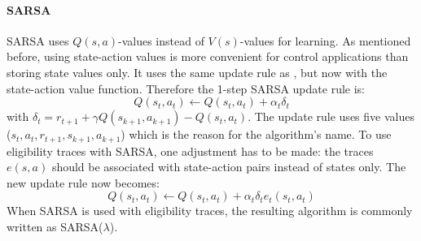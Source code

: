 \documentclass[a4paper,11pt]{mscLiterature}
\begin{document}
		\paragraph{SARSA}
		SARSA \cite{RummeryNiranjan:94} uses $Q(s,a)$-values instead of $V(s)$-values for learning. As mentioned before, using state-action values is more convenient for control applications than storing state values only. It uses the same update rule as , but now with the state-action value function. Therefore the 1-step SARSA update rule is:
		\begin{equation}\label{eqn:SARSAbasic}
				Q(s_t,a_t) \leftarrow Q(s_t,a_t) + \alpha_t \delta_t
		\end{equation}
		with $\delta_t =  r_{t+1} + \gamma Q(s_{k+1},a_{k+1}) - Q(s_t,a_t)$. The update rule uses five values ($s_t,a_t,r_{t+1},s_{k+1},a_{k+1}$) which is the reason for the algorithm's name. To use eligibility traces with SARSA, one adjustment has to be made: the traces $e(s,a)$ should be associated with state-action pairs instead of states only. The new update rule now becomes:
		\begin{equation}\label{eqn:SARSAeligibilityTraces}
				Q(s_t,a_t) \leftarrow Q(s_t,a_t) + \alpha_t \delta_t e_t(s_t,a_t)
		\end{equation}
		When SARSA is used with eligibility traces, the resulting algorithm is commonly written as SARSA($\lambda$).
\end{document}
